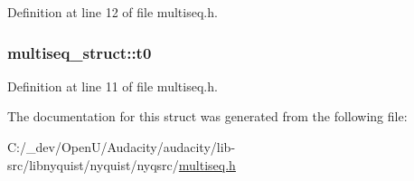 Definition at line 12 of file multiseq.\+h.

\subsubsection[{\texorpdfstring{t0}{t0}}]{ multiseq\+\_\+struct\+::t0}\hypertarget{structmultiseq__struct_a84bdbe24222b16bbd35564d497228e2d}{}\label{structmultiseq__struct_a84bdbe24222b16bbd35564d497228e2d}


Definition at line 11 of file multiseq.\+h.



The documentation for this struct was generated from the following file\+:\begin{DoxyCompactItemize}
\item 
C\+:/\+\_\+dev/\+Open\+U/\+Audacity/audacity/lib-\/src/libnyquist/nyquist/nyqsrc/\hyperlink{multiseq_8h}{multiseq.\+h}\end{DoxyCompactItemize}

